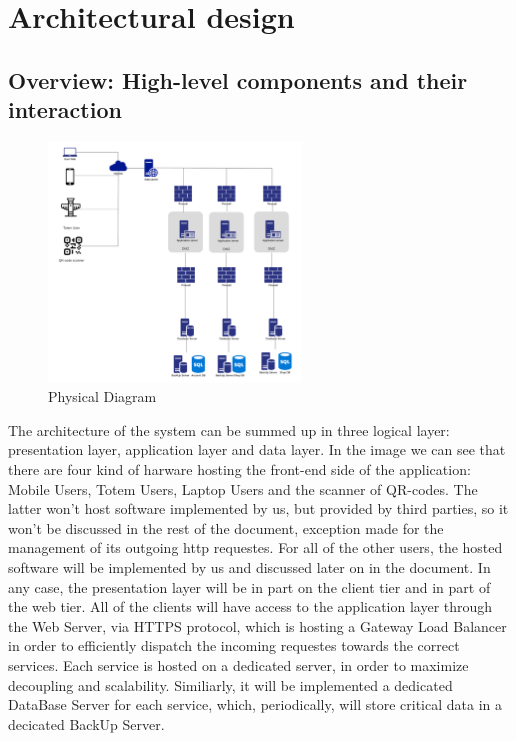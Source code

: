 \section{Architectural design}
\label{sect:overalldescription}

\subsection{Overview: High-level components and their interaction}
\label{subsect:Overview:Highlevelcomponentsandtheirinteraction}
\begin{figure}[h!]
    \centering
    \includegraphics[width=0.6\textwidth]{Images/PhysicalDiagram.png}
    \caption{\label{fig:PhysicalDiagram}{Physical Diagram}}
\end{figure}
The architecture of the system can be summed up in three logical layer: presentation layer, application layer and data layer.
In the image we can see that there are four kind of harware hosting the front-end side of the application: Mobile Users, Totem Users, Laptop Users and the scanner of QR-codes. The latter won't host software implemented by us, but provided by third parties, so it won't be discussed in the rest of the document, exception made for the management of its outgoing http requestes. For all of the other users, the hosted software will be implemented by us and discussed later on in the document.
In any case, the presentation layer will be in part on the client tier and in part of the web tier. 
All of the clients will have access to the application layer through the Web Server, via HTTPS protocol, which is hosting a Gateway Load Balancer in order to efficiently dispatch the incoming requestes towards the correct services. Each service is hosted on a dedicated server, in order to maximize decoupling and scalability. 
Similiarly, it will be implemented a dedicated DataBase Server for each service, which, periodically, will store critical data in a decicated BackUp Server.

